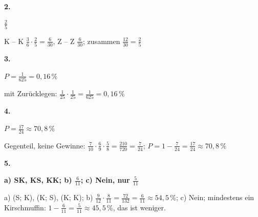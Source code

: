 \documentclass[11pt]{article}
\newcommand{\lsg}[3]{\par\noindent\begin{minipage}[t]{9mm}\textbf{#1}\end{minipage}%
  \begin{minipage}[t]{52mm}\raggedright\bfseries\boldmath #2\end{minipage}\hspace{3mm}%
  \begin{minipage}[t]{\dimexpr\linewidth-64mm\relax}\raggedright\small #3\end{minipage}\par\vspace{4pt}}
\begin{document}
\lsg{2.}{$\frac{2}{5}$}{K – K $\frac{3}{6} \cdot \frac{2}{5} = \frac{6}{30}$, Z – Z $\frac{6}{30}$; zusammen $\frac{12}{30} = \frac{2}{5}$}
\lsg{3.}{$P = \frac{1}{625} = 0{,}16\,\%$}{mit Zurücklegen: $\frac{1}{25} \cdot \frac{1}{25} = \frac{1}{625} = 0{,}16\,\%$}
\lsg{4.}{$P = \frac{17}{24} \approx 70{,}8\,\%$}{Gegenteil, keine Gewinne: $\frac{7}{10} \cdot \frac{6}{9} \cdot \frac{5}{8} = \frac{210}{720} = \frac{7}{24}$; $P = 1 - \frac{7}{24} = \frac{17}{24} \approx 70{,}8\,\%$}
\lsg{5.}{a) SK, KS, KK; b) $\frac{6}{11}$; c) Nein, nur $\frac{5}{11}$}{a) (S; K), (K; S), (K; K); b) $\frac{9}{12} \cdot \frac{8}{11} = \frac{72}{132} = \frac{6}{11} \approx 54{,}5\,\%$; c) Nein; mindestens ein Kirschmuffin: $1 - \frac{6}{11} = \frac{5}{11} \approx 45{,}5\,\%$, das ist weniger.}
\end{document}
